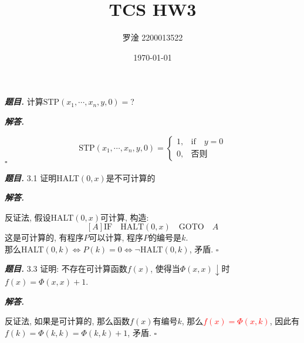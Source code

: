 \documentclass[10pt, a4paper, oneside]{ctexart}
\title{\textbf{TCS HW3}}
\author{罗淦 2200013522}
\date{\today}
\newenvironment{problem}{\begin{framed}\par\noindent\textbf{\textit{题目. }}}{\end{framed}\par}
\newenvironment{solution}{%
  \par\noindent\textbf{\textit{解答. }}\ignorespaces
}{%
  \hfill\ensuremath{\square}\par %
}
\begin{document}
\maketitle


\begin{problem}
    计算$\text{STP}(x_1,\cdots,x_n,y,0)=$?
    \end{problem}
    \begin{solution}
        $$\text{STP}(x_1,\cdots,x_n,y,0)=\begin{cases}
            1, & \text{if}\quad y=0\\
            0, &\text{否则} 
        \end{cases}$$
    \end{solution}
    
    \begin{problem}
        3.1 证明HALT$(0,x)$是不可计算的
    \end{problem}
    \begin{solution}
    反证法, 假设HALT$(0,x)$可计算, 构造:
    $$[A] \text{IF} \quad  \text{HALT}(0,x) \quad \text{GOTO} \quad A $$
    这是可计算的, 有程序$P$可以计算, 程序$P$的编号是$k$.\\
    那么HALT$(0,k) \iff P(k)=0 \iff \neg $HALT$(0,k)$, 矛盾.
    \end{solution}
    
    \begin{problem}
        3.3 证明: 不存在可计算函数$f(x)$, 使得当$\Phi(x,x)\downarrow$时$f(x) = \Phi(x,x)+1$.
    \end{problem}
    \begin{solution}
        反证法, 如果是可计算的, 那么函数$f(x)$有编号$k$, 那么\textcolor{red}{$f(x)=\Phi(x,k)$}, 因此有$f(k)=\Phi(k,k)=\Phi(k,k)+1$, 矛盾.
    \end{solution}
    
\end{document}
